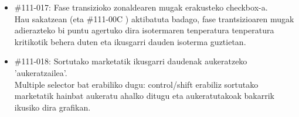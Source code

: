 \documentclass[10pt,a4paper]{article}
\let\nf\normalfont %
\newcommand{\cf}{\normalfont\sffamily}
\begin{document}
\begin{itemize}
\item \cf \#111-017: Fase transizioko zonaldearen mugak erakusteko checkbox-a.
\\
\nf Hau sakatzean (eta \cf \#111-00C \nf) aktibatuta badago, fase trantsizioaren mugak adierazteko bi puntu agertuko dira isotermaren tenperatura tenperatura kritikotik behera duten eta ikusgarri dauden isoterma guztietan.

\item \cf \#111-018: Sortutako marketatik ikusgarri daudenak aukeratzeko 'aukeratzailea'.
\\
\nf Multiple selector bat erabiliko dugu: control/shift erabiliz sortutako marketatik hainbat aukeratu ahalko ditugu eta aukeratutakoak bakarrik ikusiko dira grafikan.
\end{itemize}
\end{document}
